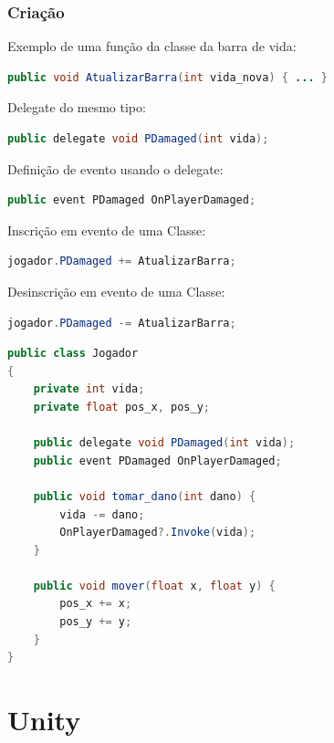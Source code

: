 \documentclass{beamer}
\begin{document}
	\begin{frame}[fragile]
		\frametitle{Criação}

		Exemplo de uma função da classe da barra de vida:
		\begin{lstlisting}[language=Java,basicstyle=\ttfamily,keywordstyle=\color{blue}]
public void AtualizarBarra(int vida_nova) { ... }
		\end{lstlisting}

		Delegate do mesmo tipo:
		\begin{lstlisting}[language=Java,basicstyle=\ttfamily,keywordstyle=\color{blue}]
public delegate void PDamaged(int vida);
		\end{lstlisting}

		Definição de evento usando o delegate:
		\begin{lstlisting}[language=Java,basicstyle=\ttfamily,keywordstyle=\color{blue}]
public event PDamaged OnPlayerDamaged;
		\end{lstlisting}

		Inscrição em evento de uma Classe:
		\begin{lstlisting}[language=Java,basicstyle=\ttfamily,keywordstyle=\color{blue}]
jogador.PDamaged += AtualizarBarra;
		\end{lstlisting}

		Desinscrição em evento de uma Classe:
		\begin{lstlisting}[language=Java,basicstyle=\ttfamily,keywordstyle=\color{blue}]
jogador.PDamaged -= AtualizarBarra;
		\end{lstlisting}

	\end{frame}

	\begin{frame}[fragile]
		\begin{lstlisting}[language=Java,basicstyle=\ttfamily,keywordstyle=\color{blue}]
public class Jogador
{
    private int vida;
    private float pos_x, pos_y;

    public delegate void PDamaged(int vida);
    public event PDamaged OnPlayerDamaged;

    public void tomar_dano(int dano) {
        vida -= dano;
        OnPlayerDamaged?.Invoke(vida);
    }

    public void mover(float x, float y) {
        pos_x += x;
        pos_y += y;
    }
}
		\end{lstlisting}
	\end{frame}

	\section{Unity}
	\frame{\sectionpage}
\end{document}
